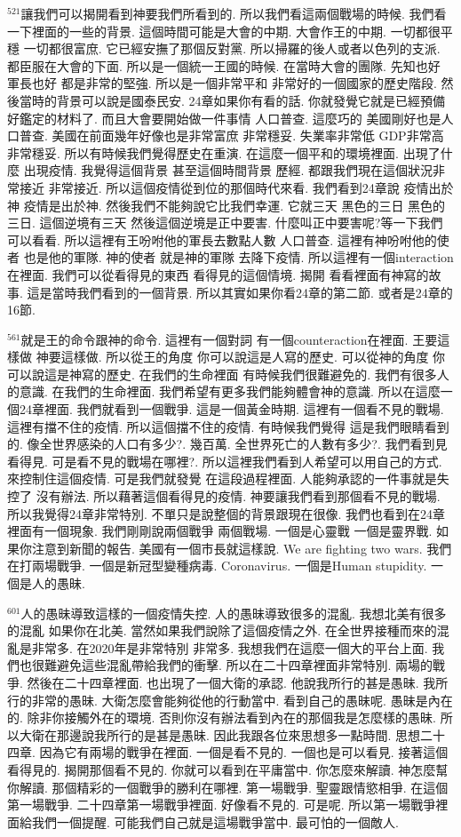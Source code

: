 \documentclass{book}
\begin{document}
$^{521}$讓我們可以揭開看到神要我們所看到的.
所以我們看這兩個戰場的時候.
我們看一下裡面的一些的背景.
這個時間可能是大會的中期.
大會作王的中期.
一切都很平穩 一切都很富庶.
它已經安撫了那個反對黨.
所以掃羅的後人或者以色列的支派.
都臣服在大會的下面.
所以是一個統一王國的時候.
在當時大會的團隊.
先知也好 軍長也好 都是非常的堅強.
所以是一個非常平和 非常好的一個國家的歷史階段.
然後當時的背景可以說是國泰民安.
24章如果你有看的話.
你就發覺它就是已經預備好鑑定的材料了.
而且大會要開始做一件事情 人口普查.
這麼巧的 美國剛好也是人口普查.
美國在前面幾年好像也是非常富庶 非常穩妥.
失業率非常低 GDP非常高 非常穩妥.
所以有時候我們覺得歷史在重演.
在這麼一個平和的環境裡面.
出現了什麼 出現疫情.
我覺得這個背景 甚至這個時間背景 歷經.
都跟我們現在這個狀況非常接近 非常接近.
所以這個疫情從到位的那個時代來看.
我們看到24章說 疫情出於神 疫情是出於神.
然後我們不能夠說它比我們幸運.
它就三天 黑色的三日 黑色的三日.
這個逆境有三天 然後這個逆境是正中要害.
什麼叫正中要害呢?等一下我們可以看看.
所以這裡有王吩咐他的軍長去數點人數 人口普查.
這裡有神吩咐他的使者 也是他的軍隊.
神的使者 就是神的軍隊 去降下疫情.
所以這裡有一個interaction在裡面.
我們可以從看得見的東西 看得見的這個情境.
揭開 看看裡面有神寫的故事.
這是當時我們看到的一個背景.
所以其實如果你看24章的第二節.
或者是24章的16節.

$^{561}$就是王的命令跟神的命令.
這裡有一個對詞 有一個counteraction在裡面.
王要這樣做 神要這樣做.
所以從王的角度 你可以說這是人寫的歷史.
可以從神的角度 你可以說這是神寫的歷史.
在我們的生命裡面 有時候我們很難避免的.
我們有很多人的意識.
在我們的生命裡面.
我們希望有更多我們能夠體會神的意識.
所以在這麼一個24章裡面.
我們就看到一個戰爭.
這是一個黃金時期.
這裡有一個看不見的戰場.
這裡有擋不住的疫情.
所以這個擋不住的疫情.
有時候我們覺得 這是我們眼睛看到的.
像全世界感染的人口有多少?.
幾百萬.
全世界死亡的人數有多少?.
我們看到見 看得見.
可是看不見的戰場在哪裡?.
所以這裡我們看到人希望可以用自己的方式.
來控制住這個疫情.
可是我們就發覺 在這段過程裡面.
人能夠承認的一件事就是失控了 沒有辦法.
所以藉著這個看得見的疫情.
神要讓我們看到那個看不見的戰場.
所以我覺得24章非常特別.
不單只是說整個的背景跟現在很像.
我們也看到在24章裡面有一個現象.
我們剛剛說兩個戰爭 兩個戰場.
一個是心靈戰 一個是靈界戰.
如果你注意到新聞的報告.
美國有一個市長就這樣說.
We are fighting two wars.
我們在打兩場戰爭.
一個是新冠型變種病毒.
Coronavirus.
一個是Human stupidity.
一個是人的愚昧.

$^{601}$人的愚昧導致這樣的一個疫情失控.
人的愚昧導致很多的混亂.
我想北美有很多的混亂 如果你在北美.
當然如果我們說除了這個疫情之外.
在全世界接種而來的混亂是非常多.
在2020年是非常特別 非常多.
我想我們在這麼一個大的平台上面.
我們也很難避免這些混亂帶給我們的衝擊.
所以在二十四章裡面非常特別.
兩場的戰爭.
然後在二十四章裡面.
也出現了一個大衛的承認.
他說我所行的甚是愚昧.
我所行的非常的愚昧.
大衛怎麼會能夠從他的行動當中.
看到自己的愚昧呢.
愚昧是內在的.
除非你接觸外在的環境.
否則你沒有辦法看到內在的那個我是怎麼樣的愚昧.
所以大衛在那邊說我所行的是甚是愚昧.
因此我跟各位來思想多一點時間.
思想二十四章.
因為它有兩場的戰爭在裡面.
一個是看不見的.
一個也是可以看見.
接著這個看得見的.
揭開那個看不見的.
你就可以看到在平庸當中.
你怎麼來解讀.
神怎麼幫你解讀.
那個精彩的一個戰爭的勝利在哪裡.
第一場戰爭.
聖靈跟情慾相爭.
在這個第一場戰爭.
二十四章第一場戰爭裡面.
好像看不見的.
可是呢.
所以第一場戰爭裡面給我們一個提醒.
可能我們自己就是這場戰爭當中.
最可怕的一個敵人.
\end{document}
